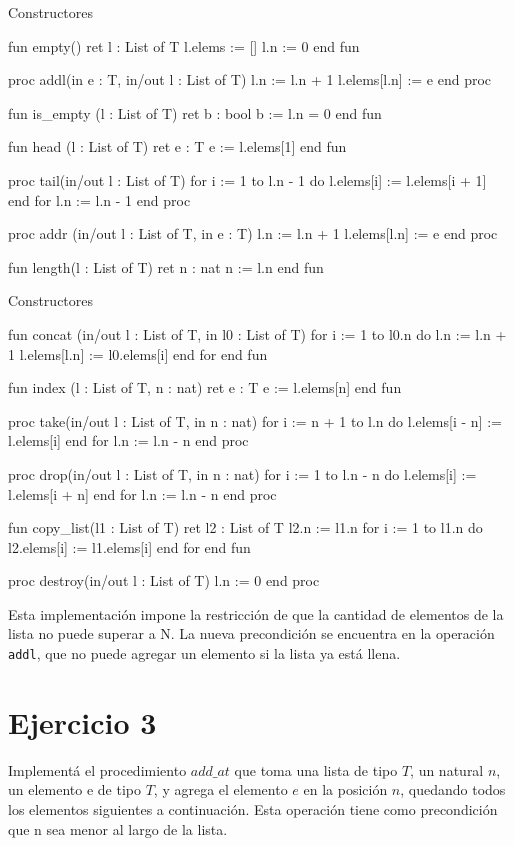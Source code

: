 \begin{codebox}{Constructores}
\begin{pascallike}
fun empty() ret l : List of T
    l.elems := []
    l.n := 0
end fun

proc addl(in e : T, in/out l : List of T)
    l.n := l.n + 1
    l.elems[l.n] := e
end proc

fun is_empty (l : List of T) ret b : bool
    b := l.n = 0
end fun

fun head (l : List of T) ret e : T
    e := l.elems[1]
end fun

proc tail(in/out l : List of T)
    for i := 1 to l.n - 1 do
        l.elems[i] := l.elems[i + 1]
    end for
    l.n := l.n - 1
end proc

proc addr (in/out l : List of T, in e : T)
    l.n := l.n + 1
    l.elems[l.n] := e
end proc

fun length(l : List of T) ret n : nat
    n := l.n
end fun
\end{pascallike}
\end{codebox}
\begin{codebox}{Constructores}
\begin{pascallike}
fun concat (in/out l : List of T, in l0 : List of T)
    for i := 1 to l0.n do
        l.n := l.n + 1
        l.elems[l.n] := l0.elems[i]
    end for
end fun

fun index (l : List of T, n : nat) ret e : T
    e := l.elems[n]
end fun

proc take(in/out l : List of T, in n : nat)
    for i := n + 1 to l.n do
        l.elems[i - n] := l.elems[i]
    end for
    l.n := l.n - n
end proc

proc drop(in/out l : List of T, in n : nat)
    for i := 1 to l.n - n do
        l.elems[i] := l.elems[i + n]
    end for
    l.n := l.n - n
end proc

fun copy_list(l1 : List of T) ret l2 : List of T
    l2.n := l1.n
    for i := 1 to l1.n do
        l2.elems[i] := l1.elems[i]
    end for
end fun

proc destroy(in/out l : List of T)
    l.n := 0
end proc
\end{pascallike}
\end{codebox}

Esta implementación impone la restricción de que la cantidad de elementos de la lista no puede superar a N. La nueva precondición se encuentra en la operación \texttt{addl}, que no puede agregar un elemento si la lista ya está llena.

\section{Ejercicio 3}
Implementá el procedimiento $add\_at$ que toma una lista de tipo $T$, un natural $n$, un elemento e de tipo $T$, y agrega el elemento $e$ en la posición $n$, quedando todos los elementos siguientes a continuación. Esta operación tiene como precondición que n sea menor al largo de la lista.

